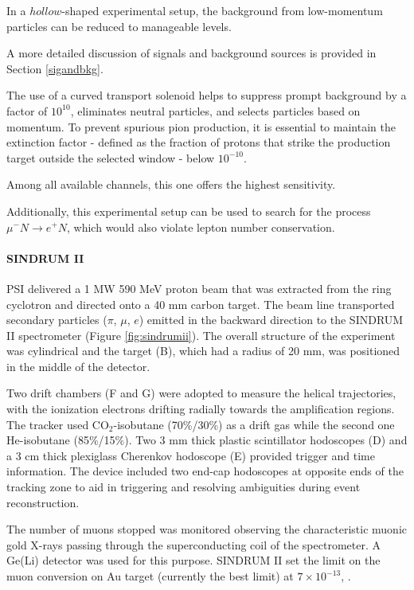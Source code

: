 In a $hollow$-shaped experimental setup, the background from low-momentum particles can be reduced to manageable levels.

A more detailed discussion of signals and background sources is provided in Section \ref{sigandbkg}.

The use of a curved transport solenoid helps to suppress 
prompt background by a factor of $10^{10}$, eliminates 
neutral particles, and selects particles based on momentum. 
To prevent spurious pion production, it is essential to maintain the 
extinction factor - defined as the fraction of protons that strike the 
production target outside the selected window - below $10^{-10}$.

Among all available channels, this one offers the highest sensitivity.

Additionally, this experimental setup can be used to
search for the process $\mu^- N \rightarrow e^+ N$, which would also violate lepton number conservation.
\paragraph{SINDRUM II}
PSI delivered a 1 MW 590 MeV proton 
beam that was extracted from the ring
cyclotron and directed onto a 40 
mm carbon target. The beam line
transported secondary particles ($\pi$, $\mu$, $e$) 
emitted in the backward 
direction to the SINDRUM II spectrometer 
(Figure \ref{fig:sindrumii}).
The overall structure of the experiment
was cylindrical and the target (B), 
which had a radius of 20 mm, was positioned
in the middle of the detector.

Two drift chambers (F and G) were adopted to measure
the helical trajectories, with the 
ionization electrons drifting radially 
towards the amplification 
regions. The tracker used CO$_2$-isobutane 
(70\%/30\%) as a drift
gas while the second one He-isobutane 
(85\%/15\%). Two 3 mm thick plastic 
scintillator hodoscopes (D) and a 3 cm 
thick plexiglass Cherenkov hodoscope 
(E) provided trigger and time information. 
The device included two end-cap hodoscopes 
at opposite ends of the tracking zone to 
aid in triggering 
and resolving ambiguities during event reconstruction.

The number of muons stopped
was monitored observing the characteristic 
muonic gold X-rays passing through the
superconducting coil of the spectrometer. 
A Ge(Li) detector was used for this purpose.
SINDRUM II set the limit on the 
muon conversion on Au target 
(currently the best limit) at $7 \times 10^{-13}$, 
\cite{SINDRUMII:2006dvw}.

